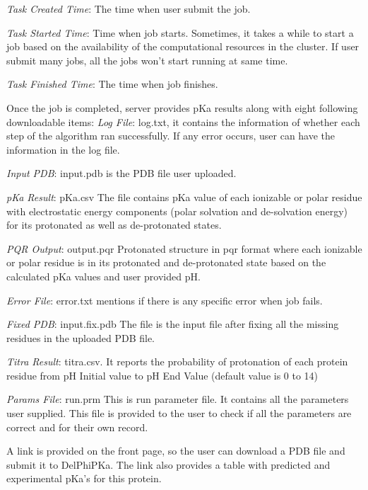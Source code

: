 \documentclass[9pt,tutorial,pubversion]{livecoms}
\begin{document}
\textit{Task Created Time}: The time when user submit the job.

\textit{Task Started Time}: Time when job starts. Sometimes, it takes a while to start a job based on the availability of the computational resources in the cluster. If user submit many jobs, all the jobs won’t start running at same time.

\textit{Task Finished Time}: The time when job finishes.

Once the job is completed, server provides pKa results along with eight following downloadable items:
\textit{Log File}: log.txt, it contains the information of whether each step of the algorithm ran successfully. If any error occurs, user can have the information in the log file.

\textit{Input PDB}: input.pdb is the PDB file user uploaded.

\textit{pKa Result}: pKa.csv The file contains pKa value of each ionizable or polar residue with electrostatic energy components (polar solvation and de-solvation energy) for its protonated as well as de-protonated states.

\textit{PQR Output}: output.pqr Protonated structure in pqr format where each ionizable or polar residue is in its protonated and de-protonated state based on the calculated pKa values and user provided pH.

\textit{Error File}: error.txt mentions if there is any specific error when job fails.

\textit{Fixed PDB}: input.fix.pdb The file is the input file after fixing all the missing residues in the uploaded PDB file.

\textit{Titra Result}: titra.csv.   It reports the probability of protonation of each protein residue from pH Initial value to pH End Value (default value is 0 to 14)

\textit{Params File}: run.prm This is run parameter file. It contains all the parameters user supplied. This file is provided to the user to check if all the parameters are correct and for their own record. 

A link is provided on the front page, so the user can download a PDB file and submit it to DelPhiPKa. The link also provides a table with predicted and experimental pKa's for this protein.
\end{document}
